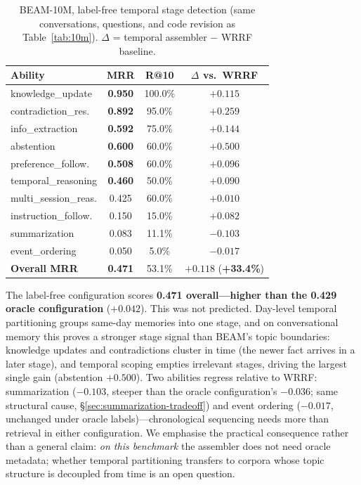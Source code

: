 \documentclass[11pt]{article}
\begin{document}
\begin{table}[t]
\centering
\caption{BEAM-10M, label-free temporal stage detection (same
  conversations, questions, and code revision as
  Table~\ref{tab:10m}).  $\Delta$ = temporal assembler $-$ WRRF
  baseline.}
\label{tab:10m-temporal}
\small
\begin{tabular}{lccc}
\toprule
Ability & MRR & R@10 & $\Delta$ vs.\ WRRF \\
\midrule
knowledge\_update & \textbf{0.950} & 100.0\% & $+0.115$ \\
contradiction\_res. & \textbf{0.892} & 95.0\% & $+0.259$ \\
info\_extraction & \textbf{0.592} & 75.0\% & $+0.144$ \\
abstention & \textbf{0.600} & 60.0\% & $+0.500$ \\
preference\_follow. & \textbf{0.508} & 60.0\% & $+0.096$ \\
temporal\_reasoning & \textbf{0.460} & 50.0\% & $+0.090$ \\
multi\_session\_reas. & 0.425 & 60.0\% & $+0.010$ \\
instruction\_follow. & 0.150 & 15.0\% & $+0.082$ \\
summarization & 0.083 & 11.1\% & $-0.103$ \\
event\_ordering & 0.050 & 5.0\% & $-0.017$ \\
\midrule
\textbf{Overall MRR} & \textbf{0.471} & 53.1\% & $+0.118$ (\textbf{+33.4\%}) \\
\bottomrule
\end{tabular}
\end{table}

The label-free configuration scores \textbf{0.471 overall---higher
than the 0.429 oracle configuration} ($+0.042$).  This was not
predicted.  Day-level temporal partitioning groups same-day memories
into one stage, and on conversational memory this proves a stronger
stage signal than BEAM's topic boundaries: knowledge updates and
contradictions cluster in time (the newer fact arrives in a later
stage), and temporal scoping empties irrelevant stages, driving the
largest single gain (abstention $+0.500$).  Two abilities regress
relative to WRRF: summarization ($-0.103$, steeper than the oracle
configuration's $-0.036$; same structural cause,
\S\ref{sec:summarization-tradeoff}) and event ordering ($-0.017$,
unchanged under oracle labels)---chronological sequencing needs more
than retrieval in either configuration.  We emphasise the practical
consequence rather than a general claim: \emph{on this benchmark}
the assembler does not need oracle metadata; whether temporal
partitioning transfers to corpora whose topic structure is
decoupled from time is an open question.
\end{document}
